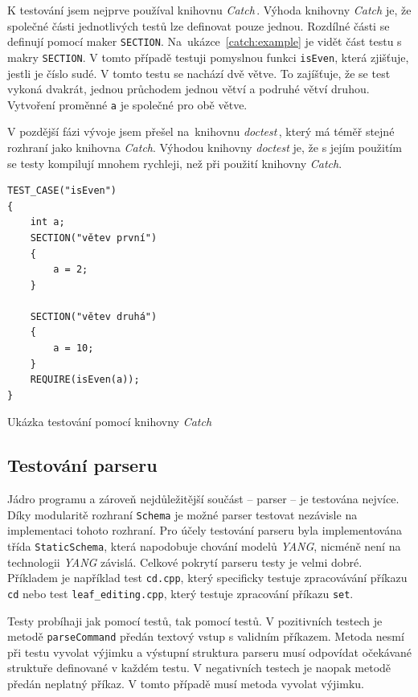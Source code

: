 \documentclass[thesis=B,czech,hidelinks]{FITthesis}[2019/03/06]
\begin{document}
K testování jsem nejprve používal knihovnu \textit{Catch}\,\cite{catch}. Výhoda knihovny \textit{Catch} je, že společné části jednotlivých testů lze definovat pouze jednou. Rozdílné části se definují pomocí maker \texttt{SECTION}. Na~ukázce~\ref{catch:example} je vidět část testu s makry \texttt{SECTION}. V tomto případě testuji pomyslnou funkci \texttt{isEven}, která zjišťuje, jestli je číslo sudé. V tomto testu se nachází dvě větve. To zajíšťuje, že se test vykoná dvakrát, jednou průchodem jednou větví a podruhé větví druhou. Vytvoření proměnné \texttt{a} je společné pro obě větve.

V pozdější fázi vývoje jsem přešel na~knihovnu \textit{doctest}\,\cite{doctest}, který má téměř stejné rozhraní jako knihovna \textit{Catch}. Výhodou knihovny \textit{doctest} je, že s jejím použitím se testy kompilují mnohem rychleji, než při použití knihovny \textit{Catch}.

\begin{listing}
\begin{verbatim}
TEST_CASE("isEven")
{
    int a;
    SECTION("větev první")
    {
        a = 2;
    }

    SECTION("větev druhá")
    {
        a = 10;
    }
    REQUIRE(isEven(a));
}
\end{verbatim}
\caption{Ukázka testování pomocí knihovny \textit{Catch}}\label{catch:example}
\end{listing}

\subsection{Testování parseru}
Jádro programu a zároveň nejdůležitější součást -- parser -- je testována nejvíce. Díky modularitě rozhraní \texttt{Schema} je možné parser testovat nezávisle na implementaci tohoto rozhraní. Pro účely testování parseru byla implementována třída \texttt{StaticSchema}, která napodobuje chování modelů \textit{YANG}, nicméně není na technologii \textit{YANG} závislá. Celkové pokrytí parseru testy je velmi dobré. Příkladem je například test \texttt{cd.cpp}, který specificky testuje zpracovávání příkazu \texttt{cd} nebo test \texttt{leaf\_editing.cpp}, který testuje zpracování příkazu \texttt{set}.

Testy probíhaji jak pomocí  testů, tak pomocí  testů. V pozitivních testech je metodě \texttt{parseCommand} předán textový vstup s validním příkazem. Metoda nesmí při testu vyvolat výjimku a výstupní struktura parseru musí odpovídat očekávané struktuře definované v každém testu. V negativních testech je naopak metodě předán neplatný příkaz. V tomto případě musí metoda vyvolat výjimku.
\end{document}
